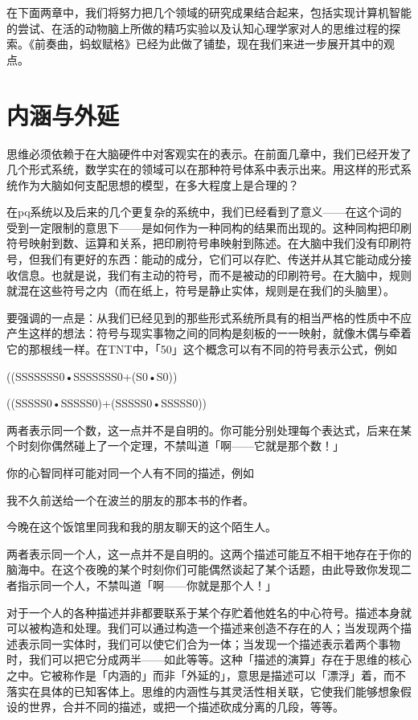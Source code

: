 \documentclass[
  12pt,
  twoside,
  openright,
  oldfontcommands,
]{memoir}
\begin{document}
在下面两章中，我们将努力把几个领域的研究成果结合起来，包括实现计算机智能的尝试、在活的动物脑上所做的精巧实验以及认知心理学家对人的思维过程的探索。《前奏曲，蚂蚁赋格》已经为此做了铺垫，现在我们来进一步展开其中的观点。

\section{内涵与外延}

思维必须依赖于在大脑硬件中对客观实在的表示。在前面几章中，我们已经开发了几个形式系统，数学实在的领域可以在那种符号体系中表示出来。用这样的形式系统作为大脑如何支配思想的模型，在多大程度上是合理的？

在pq系统以及后来的几个更复杂的系统中，我们已经看到了意义------在这个词的受到一定限制的意思下------是如何作为一种同构的结果而出现的。这种同构把印刷符号映射到数、运算和关系，把印刷符号串映射到陈述。在大脑中我们没有印刷符号，但我们有更好的东西：能动的成分，它们可以存贮、传送并从其它能动成分接收信息。也就是说，我们有主动的符号，而不是被动的印刷符号。在大脑中，规则就混在这些符号之内（而在纸上，符号是静止实体，规则是在我们的头脑里）。

要强调的一点是：从我们已经见到的那些形式系统所具有的相当严格的性质中不应产生这样的想法：符号与现实事物之间的同构是刻板的一一映射，就像木偶与牵着它的那根线一样。在TNT中，「50」这个概念可以有不同的符号表示公式，例如

((SSSSSSS0•SSSSSSS0+(S0•S0))

((SSSSS0•SSSSS0)+(SSSSS0•SSSSS0))

两者表示同一个数，这一点并不是自明的。你可能分别处理每个表达式，后来在某个时刻你偶然碰上了一个定理，不禁叫道「啊------它就是那个数！」

你的心智同样可能对同一个人有不同的描述，例如

我不久前送给一个在波兰的朋友的那本书的作者。

今晚在这个饭馆里同我和我的朋友聊天的这个陌生人。

两者表示同一个人，这一点并不是自明的。这两个描述可能互不相干地存在于你的脑海中。在这个夜晚的某个时刻你们可能偶然谈起了某个话题，由此导致你发现二者指示同一个人，不禁叫道「啊------你就是那个人！」

对于一个人的各种描述并非都要联系于某个存贮着他姓名的中心符号。描述本身就可以被构造和处理。我们可以通过构造一个描述来创造不存在的人；当发现两个描述表示同一实体时，我们可以使它们合为一体；当发现一个描述表示着两个事物时，我们可以把它分成两半------如此等等。这种「描述的演算」存在于思维的核心之中。它被称作是「内涵的」而非「外延的」，意思是描述可以「漂浮」着，而不落实在具体的已知客体上。思维的内涵性与其灵活性相关联，它使我们能够想象假设的世界，合并不同的描述，或把一个描述砍成分离的几段，等等。
\end{document}
